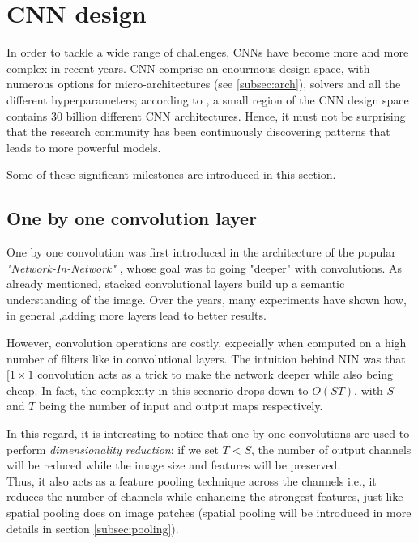 \section{CNN design}
In order to tackle a wide range of challenges, CNNs have become more and more complex in recent years. CNN comprise an enourmous design space, with numerous options for micro-architectures (see \ref{subsec:arch}), solvers and all the different hyperparameters; according to \parencite{cnn-design}, a small region of the CNN design space contains 30 billion different CNN architectures. Hence, it must not be surprising that the research community has been continuously discovering patterns that leads to more powerful models. 

Some of these significant milestones are introduced in this section. 

\subsection{One by one convolution layer}
\label{subsec:onebyone}
One by one convolution was first introduced in the architecture of the popular \emph{"Network-In-Network"} \parencite{NIN}, whose goal was to going "deeper" with convolutions. As already mentioned, stacked convolutional layers build up a semantic understanding of the image. Over the years, many experiments have shown how, in general ,adding more layers lead to better results.

However, convolution operations are costly, expecially when computed on a high number of filters like in convolutional layers. The intuition behind NIN was that $[1 \times 1$ convolution acts as a trick to make the network deeper while also being cheap. In fact, 
the complexity in this scenario drops down to $O(ST)$, with $S$ and $T$ being the number of input and output maps respectively. 
\newline

In this regard, it is interesting to notice that one by one convolutions are used to perform \emph{dimensionality reduction}: if we set $T < S$, the number of output channels will be reduced while the image size and features will be preserved. 
\\
Thus, it also acts as a feature pooling technique across the channels i.e., it reduces the number of channels while enhancing the strongest features, just like spatial pooling does on image patches (spatial pooling will be introduced in more details in section \ref{subsec:pooling}).
\newline 


